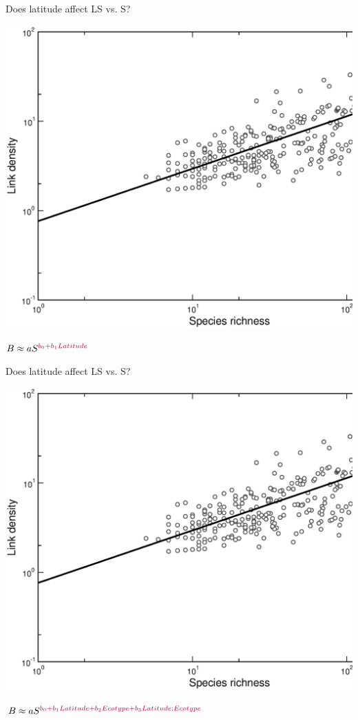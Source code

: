 \documentclass{beamer}
\begin{document}
  \begin{frame}{Does latitude affect LS vs. S?}
    \begin{center}
      \includegraphics*[width=.8\textwidth]{Figures/results/LS_vs_S_fitline_observed.eps}

      \vspace{.5cm}
    \end{center}
    \hspace{1in}
      $B \approx aS^{\color{purple}b_0+b_1Latitude}$

  \end{frame}


  \begin{frame}{Does latitude affect LS vs. S?}
    \begin{center}
      \includegraphics*[width=.8\textwidth]{Figures/results/LS_vs_S_fitline_observed.eps}

      \vspace{.5cm}
    \end{center}
    \hspace{1in}
      $B \approx aS^{\color{purple}b_0+b_1Latitude+b_2Ecotype+b_3Latitude:Ecotype}$

  \end{frame}
\end{document}
